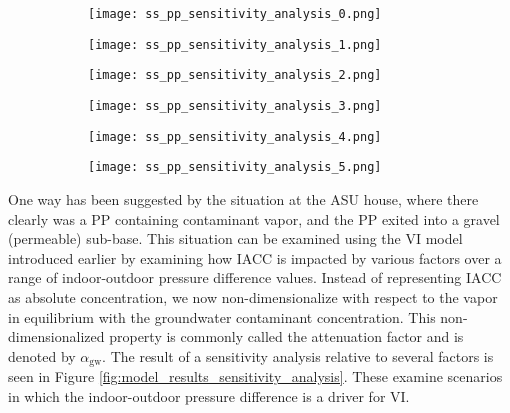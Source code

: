 \documentclass[journal=esthag,manuscript=article]{achemso}
\begin{document}
\begin{figure}[htb!]
  \caption{Attenuation factor relative to contaminant vapor in equilibrium with groundwater as a function of indoor-outdoor pressure difference. The effects of a preferential pathway, that is either contaminated or uncontaminated as well as that of having a gravel sub-base vs. uniform sandy clay soil are considered.}
  \label{fig:model_results_sensitivity_analysis}
  \begin{subfigure}[t]{0.45\textwidth}
    \caption{ }
    \label{fig:model_results_sensitivity_analysis_0}
    \texttt{[image: ss\_pp\_sensitivity\_analysis\_0.png]}
  \end{subfigure}
  \begin{subfigure}[t]{0.45\textwidth}
    \caption{ }
    \label{fig:model_results_sensitivity_analysis_1}
    \texttt{[image: ss\_pp\_sensitivity\_analysis\_1.png]}
  \end{subfigure}
  \begin{subfigure}[t]{0.45\textwidth}
    \caption{ }
    \label{fig:model_results_sensitivity_analysis_2}
    \texttt{[image: ss\_pp\_sensitivity\_analysis\_2.png]}
  \end{subfigure}
  \begin{subfigure}[t]{0.45\textwidth}
    \caption{ }
    \label{fig:model_results_sensitivity_analysis_3}
    \texttt{[image: ss\_pp\_sensitivity\_analysis\_3.png]}
  \end{subfigure}
  \begin{subfigure}[t]{0.45\textwidth}
    \caption{ }
    \label{fig:model_results_sensitivity_analysis_4}
    \texttt{[image: ss\_pp\_sensitivity\_analysis\_4.png]}
  \end{subfigure}
  \begin{subfigure}[t]{0.45\textwidth}
    \caption{ }
    \label{fig:model_results_sensitivity_analysis_5}
    \texttt{[image: ss\_pp\_sensitivity\_analysis\_5.png]}
  \end{subfigure}
\end{figure}

One way has been suggested by the situation at the ASU house, where there clearly was a PP containing contaminant vapor, and the PP exited into a gravel (permeable) sub-base.
This situation can be examined using the VI model introduced earlier by examining how IACC is impacted by various factors over a range of indoor-outdoor pressure difference values.
Instead of representing IACC as absolute concentration, we now non-dimensionalize with respect to the vapor in equilibrium with the groundwater contaminant concentration.
This non-dimensionalized property is commonly called the attenuation factor and is denoted by $\alpha_\mathrm{gw}$.
The result of a sensitivity analysis relative to several factors is seen in Figure \ref{fig:model_results_sensitivity_analysis}.
These examine scenarios in which the indoor-outdoor pressure difference is a driver for VI.
\end{document}
